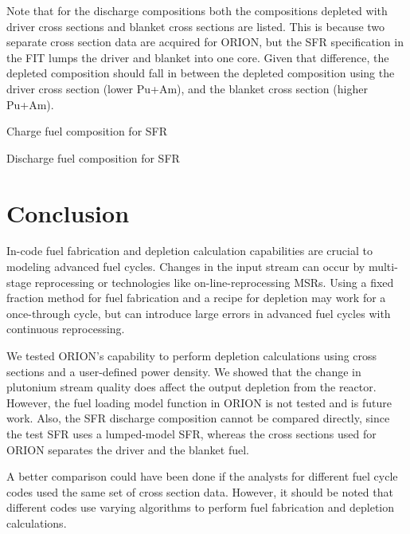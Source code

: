 \documentclass{article}
\begin{document}
Note that for the discharge compositions both the compositions depleted with driver
cross sections and blanket cross sections are listed. This is because two separate
cross section data are acquired for ORION, but the \gls{SFR} specification in the
FIT lumps the driver and blanket into one core. Given that difference, the depleted
composition should fall in between the depleted composition using the driver cross section (lower Pu+Am),
and the blanket cross section (higher Pu+Am).

\begin{table}[h]
    \centering
    
    \caption{Charge fuel composition for \gls{SFR}}
    \label{fig:sfr_charge}
\end{table}

\begin{table}[h]
    \centering
    \resizebox{\textwidth}{!}{
    }
    \caption{Discharge fuel composition for \gls{SFR}}
    \label{fig:sfr_discharge}
\end{table}

\FloatBarrier

\section{Conclusion}
In-code fuel fabrication and depletion calculation capabilities are crucial
to modeling advanced fuel cycles.
Changes in the input stream can occur by multi-stage reprocessing or
technologies like on-line-reprocessing \glspl{MSR}. Using a fixed fraction method
for fuel fabrication and a recipe for depletion may work for a once-through cycle,
but can introduce large errors in advanced fuel cycles with continuous reprocessing.

We tested ORION's capability to perform depletion calculations
using cross sections and a user-defined power density. We showed that
the change in plutonium stream quality does affect the output depletion
from the reactor. However, the fuel loading model function in ORION is not tested
and is future work. Also, the \gls{SFR} discharge composition cannot be
compared directly, since the test \gls{SFR} uses a lumped-model \gls{SFR},
whereas the cross sections used for ORION separates the driver and the blanket fuel.

A better comparison could have been done if the analysts for different fuel cycle
codes used the same set of cross section data. However, it should be noted that
different codes use varying algorithms to perform fuel fabrication and depletion
calculations.




\end{document}

